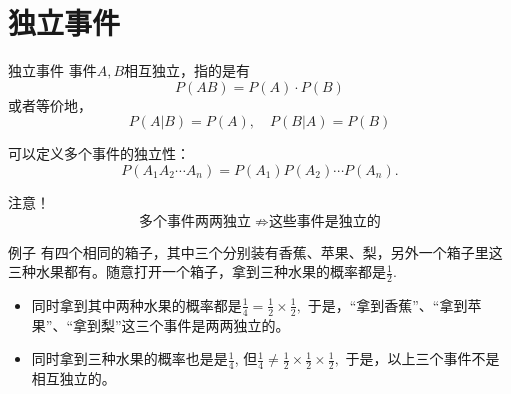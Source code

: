 \documentclass[10pt]{beamer}
\begin{document}



\section{独立事件}


\begin{frame}

\begin{block}{独立事件}
事件$A,B$相互独立，指的是有
$$P(AB) = P(A)\cdot P(B)$$
或者等价地，
$$P(A|B) = P(A), \quad P(B|A) = P(B)$$

\vspace{1em}
\pause

可以定义多个事件的独立性：
$$P(A_1A_2\cdots A_n) = P(A_1)P(A_2)\cdots P(A_n).$$

\vspace{1em}
\pause

{\color{red}注意}！
$$\text{多个事件两两独立} \; \not\Rightarrow \text{这些事件是独立的}$$
\end{block}

\end{frame}


\begin{frame}

\begin{block}{例子}
有四个相同的箱子，其中三个分别装有香蕉、苹果、梨，另外一个箱子里这三种水果都有。随意打开一个箱子，拿到三种水果的概率都是$\frac{1}{2}$.
\begin{itemize}
\item 同时拿到其中两种水果的概率都是$\frac{1}{4} = \frac{1}{2} \times \frac{1}{2},$ 于是，``拿到香蕉''、``拿到苹果''、``拿到梨''这三个事件是两两独立的。
\item 同时拿到三种水果的概率也是是$\frac{1}{4}$, 但$\frac{1}{4} \neq \frac{1}{2} \times \frac{1}{2} \times \frac{1}{2},$ 于是，以上三个事件不是相互独立的。
\end{itemize}
\end{block}

\end{frame}
\end{document}
